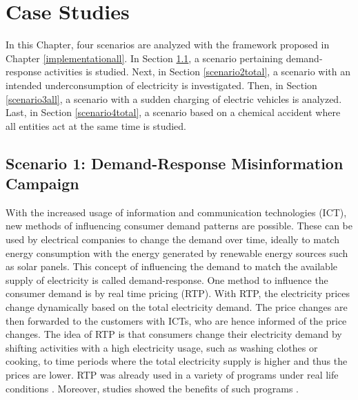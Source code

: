 \chapter{Case Studies}
\label{results}

In this Chapter, four scenarios are analyzed with the framework 
proposed in Chapter \ref{implementationall}.
In Section \ref{demandresponsesection}, a scenario
pertaining demand-response activities is studied.
Next, in Section \ref{scenario2total}, a scenario
with an intended underconsumption of electricity is 
investigated. Then, in Section \ref{scenario3all},
a scenario with a sudden charging of electric vehicles
is analyzed.
Last, in Section \ref{scenario4total}, a scenario 
based on a chemical accident where all entities act at 
the same time is studied.


\section{Scenario 1: Demand-Response Misinformation Campaign}
\label{demandresponsesection}

With the increased usage of information and communication 
technologies (ICT), new methods of influencing
consumer demand patterns are possible. 
These can be used by electrical companies to change the 
demand over time, ideally to match energy consumption
with the energy generated by renewable energy sources such 
as solar panels. 
This concept of influencing the demand to match the 
available supply of electricity is called demand-response. 
One method to influence the consumer demand is by real time 
pricing (RTP). With RTP, the electricity prices change
dynamically based on the total electricity demand.
The price changes are then forwarded to the customers with ICTs, 
who are hence informed of the price changes.
The idea of RTP is that consumers change their electricity demand
by shifting activities with a high electricity usage, 
such as washing clothes or cooking, to time periods 
where the total electricity supply is higher and thus the prices
are lower.
RTP was already used in a variety of programs
under real life conditions \cite{barbose2004survey}.
Moreover, studies showed the benefits of such programs \cite{albadi2008summary}.

